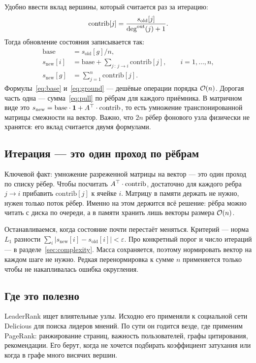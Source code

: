 Удобно ввести вклад вершины, который считается раз за итерацию:
\[
  \mathrm{contrib}[j] = \frac{s_{\mathrm{old}}[j]}{\deg^{\mathrm{out}}(j)+1}.
\]
Тогда обновление состояния записывается так:
\begin{align}
  \mathrm{base} &= s_{\mathrm{old}}[g]/n, \label{eq:base}\\
  s_{\mathrm{new}}[i] &= \mathrm{base} + \sum_{j\,:\,j\to i}\mathrm{contrib}[j],
      \qquad i=1,\dots,n, \label{eq:pull}\\
  s_{\mathrm{new}}[g] &= \sum_{j=1}^{n}\mathrm{contrib}[j]. \label{eq:ground}
\end{align}
Формулы~\eqref{eq:base} и~\eqref{eq:ground} --- дешёвые операции порядка $\mathcal{O}(n)$. Дорогая часть
одна --- сумма~\eqref{eq:pull} по рёбрам для каждого приёмника. В матричном виде это
$s_{\mathrm{new}} = \mathrm{base}\cdot\mathbf{1} + A^{\top}\cdot\mathrm{contrib}$, то есть умножение
транспонированной матрицы смежности на вектор. Важно, что $2n$ рёбер фонового узла физически не
хранятся: его вклад считается двумя формулами.

\subsection{Итерация --- это один проход по рёбрам}
Ключевой факт: умножение разреженной матрицы на вектор --- это один проход по списку рёбер. Чтобы
посчитать $A^{\top}\cdot\mathrm{contrib}$, достаточно для каждого ребра $j\to i$ прибавить
$\mathrm{contrib}[j]$ к ячейке $i$. Матрицу в памяти держать не нужно, нужен только поток рёбер.
Именно на этом держится всё решение: рёбра можно читать с диска по очереди, а в памяти хранить лишь
векторы размера $\mathcal{O}(n)$.

Останавливаемся, когда состояние почти перестаёт меняться. Критерий --- норма $L_1$ разности
$\sum_i |s_{\mathrm{new}}[i] - s_{\mathrm{old}}[i]| < \varepsilon$. Про конкретный порог и число
итераций --- в разделе~\ref{sec:complexity}. Масса сохраняется, поэтому нормировать вектор на каждом
шаге не нужно. Редкая перенормировка к сумме $n$ применяется только чтобы не накапливалась ошибка
округления.

\subsection{Где это полезно}
LeaderRank ищет влиятельные узлы. Исходно его применяли к социальной сети Delicious для поиска
лидеров мнений. По сути он годится везде, где применим PageRank: ранжирование
страниц, важность пользователей, графы цитирования, рекомендации. Его берут, когда не хочется
подбирать коэффициент затухания или когда в графе много висячих вершин.

